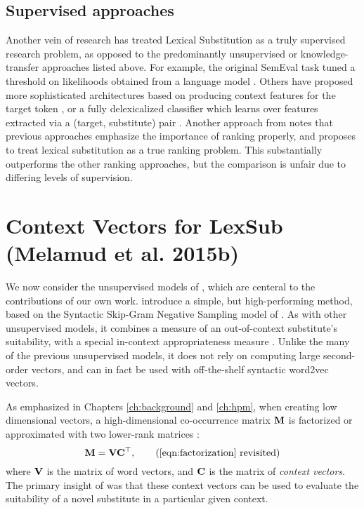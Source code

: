 \subsection{Supervised approaches}

Another vein of research has treated Lexical Substitution as a truly
supervised research problem, as opposed to the predominantly unsupervised or
knowledge-transfer approaches listed above. For example, the original SemEval
task tuned a threshold on likelihoods obtained from a language
model \cite{yuret:2007:semeval}. Others have proposed more sophisticated
architectures based on producing context features for the target token
\cite{biemann:2012:lrec}, or a fully delexicalized classifier which learns over
features extracted via a (target, substitute) pair \cite{szarvas:2013:naacl}.
Another approach from  notes that previous
approaches emphasize the importance of ranking properly, and proposes to treat
lexical substitution as a true ranking problem. This substantially outperforms
the other ranking approaches, but the comparison is unfair due to differing
levels of supervision.

\section{Context Vectors for LexSub (Melamud et al. 2015b)}
\label{sec:melamud}

We now consider the unsupervised models of , which
are centeral to the contributions of our own work.
 introduce a simple, but high-performing method,
based on the Syntactic Skip-Gram Negative Sampling model of
. As with other unsupervised models, it combines a
measure of an out-of-context substitute's suitability, with a special
in-context appropriateness measure \cite{erk:2008:emnlp}. Unlike the many of
the previous unsupervised models, it does not rely on computing large
second-order vectors, and can in fact be used with off-the-shelf syntactic
word2vec vectors.

As emphasized in Chapters \ref{ch:background} and \ref{ch:hpm}, when creating
low dimensional vectors, a high-dimensional co-occurrence matrix ${{\mathbf{M}}}$ is
factorized or approximated with two lower-rank matrices \cite{levy:2014:nips}:
\begin{equation*}
  \mM = \mV\mC\trans,
  \tag{\ref{eqn:factorization} revisited}
\end{equation*}
where ${{\mathbf{V}}}$ is the matrix of word vectors, and ${{\mathbf{C}}}$ is the matrix of
{\em context vectors}. The primary insight of 
was that these context vectors can be used to evaluate the suitability of a
novel substitute in a particular given context.

